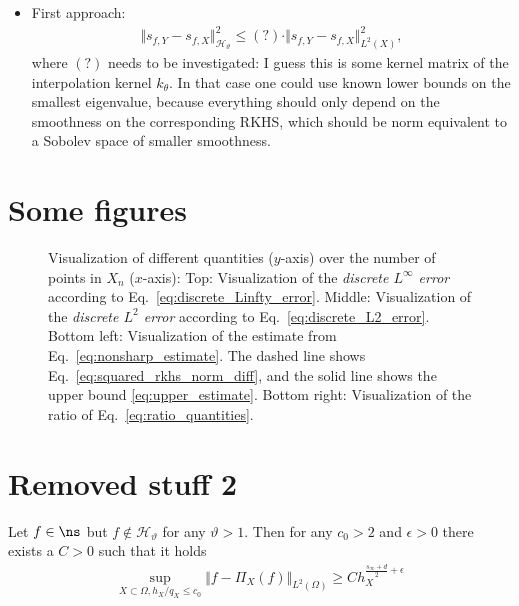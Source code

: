 \documentclass[a4paper, 10pt]{article}
\newlength\fwidth
\newcommand{\Ht}{\mathcal{H}_{\vartheta}}
\begin{document}
\begin{itemize}
\item First approach:
\begin{align*}
\Vert s_{f, Y} - s_{f, X} \Vert_{\Ht}^2 \leq (?) \cdot \Vert s_{f, Y} - s_{f, X} \Vert_{L^2(X)}^2,
\end{align*}
where $(?)$ needs to be investigated: 
I guess this is some kernel matrix of the interpolation kernel $k_\theta$.
In that case one could use known lower bounds on the smallest eigenvalue, because everything should only depend on the smoothness on the corresponding RKHS, which should be norm equivalent to a Sobolev space of smaller smoothness. \\
\end{itemize}


\section{Some figures}

\begin{figure}[h]
\centering
\setlength{}


\setlength{}

%

\caption{
Visualization of different quantities ($y$-axis) over the number of points in $X_n$ ($x$-axis): \newline
Top: Visualization of the \textit{discrete $L^\infty$ error} according to Eq.\ \eqref{eq:discrete_Linfty_error}.
Middle: Visualization of the \textit{discrete $L^2$ error} according to Eq.\ \eqref{eq:discrete_L2_error}.
Bottom left: Visualization of the estimate from Eq.\ \eqref{eq:nonsharp_estimate}. The dashed line shows Eq.\ \eqref{eq:squared_rkhs_norm_diff}, and the solid line shows the upper bound \eqref{eq:upper_estimate}.
Bottom right: Visualization of the ratio of Eq.\ \eqref{eq:ratio_quantities}.
}
\label{fig:brownian_bridge_example}
\end{figure}


\section{Removed stuff 2}


\begin{theorem}
\label{th:lower_bound_1}
Let $f \in \ns$ but $f \notin \Ht$ for any $\vartheta > 1$.
Then for any $c_0 > 2$ and $\epsilon > 0$ there exists a $C > 0$ such that it holds 
\begin{align*}
\sup_{X \subset \Omega, h_X / q_X \leq c_0} \Vert f - \Pi_X(f) \Vert_{L^2(\Omega)} \geq C h_X^{\frac{s_\infty + d}{2} + \epsilon}
\end{align*}
\end{theorem}
\end{document}
